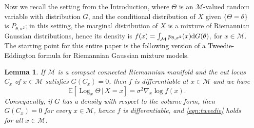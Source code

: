 \documentclass[preprint]{imsart}
\theoremstyle{plain}
\newtheorem{lemma}[theorem]{Lemma}
\theoremstyle{definition}
\newtheorem{remark}[theorem]{Remark}
\newcommand{\Ebb}{\mathbb{E}}
\newcommand{\Mcal}{\mathcal{M}}
\newcommand{\diff}{\textnormal{d}}
\DeclareMathOperator{\Log}{Log}
\begin{document}

Now we recall the setting from the Introduction, where $\Theta$ is an $\Mcal$-valued random variable with distribution $G$, and the conditional distribution of $X$ given $\{\Theta=\theta\}$ is $P_{\theta,\sigma^2}$; in this setting, the marginal distribution of $X$ is a mixture of Riemannian Gaussian distributions, hence its density is $f(x) =\int_{\Mcal}p_{\theta,\sigma^2}(x)\diff G(\theta)$, for $x \in \Mcal$.
The starting point for this entire paper is the following version of a Tweedie-Eddington formula for Riemannian Gaussian mixture models.

\begin{lemma}\label{lem:Tweedie}
    If $\Mcal$ is a compact connected Riemannian manifold and the cut locus $C_x$ of $x\in\Mcal$ satisfies $G(C_x) = 0$, then $f$ is differentiable at $x\in\Mcal$ and we have \begin{equation}\label{eqn:tweedie}
        \Ebb[\Log_{x}\Theta\,|\,X=x] = \sigma^{2}\nabla_{x}\log f(x).
    \end{equation}
    Consequently, if $G$ has a density with respect to the volume form,  then $G(C_x) = 0$ for every $x \in \Mcal$, hence $f$ is differentiable, and \eqref{eqn:tweedie} holds for all $x\in\Mcal$.
\end{lemma}
\end{document}
